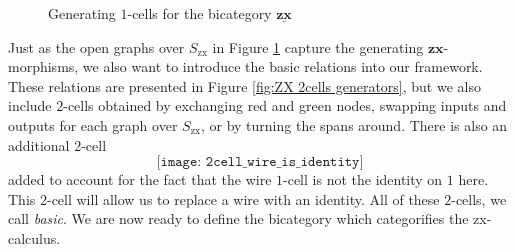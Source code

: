 \documentclass[11pt]{amsart}
\newcommand{\cat}[1]{\mathbf{#1}}
\theoremstyle{remark}
\theoremstyle{definition}
\newcommand{\zx}{_{\text{zx}}}
\newcommand{\bicat}[1]{\underline{\mathbf{#1}}}
\begin{document}
\begin{figure}[h]
	\caption{Generating $1$-cells for the bicategory $\bicat{zx}$}
	\label{fig:ZX 1cells generators}
\end{figure} 

Just as the open graphs over $S_{\text{zx}}$ in Figure \ref{fig:ZX 1cells generators} capture the generating $\cat{zx}$-morphisms, we also want to introduce the basic relations into our framework.  These relations are presented in Figure \ref{fig:ZX 2cells generators}, but we also include $2$-cells obtained by exchanging red and green nodes, swapping inputs and outputs for each graph over $S\zx$, or by turning the spans around.  There is also an additional $2$-cell
\[
\texttt{[image: 2cell\_wire\_is\_identity]}
\]
added to account for the fact that the wire $1$-cell is not the identity on $1$ here. This $2$-cell will allow us to replace a wire with an identity. All of these $2$-cells, we call \emph{basic}.  We are now ready to define the bicategory which categorifies the zx-calculus.
\end{document}

